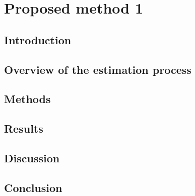 \chapter{Proposed method 1}
\label{chapter:method_1} 


\section{Introduction}

\lipsum[2-4]

\section{Overview of the estimation process}

\lipsum[2-4]

\section{Methods}

\lipsum[2-4]
    
\section{Results}

\lipsum[2-4]

\section{Discussion}

\lipsum[2-4]

\section{Conclusion}

\lipsum[2-4]